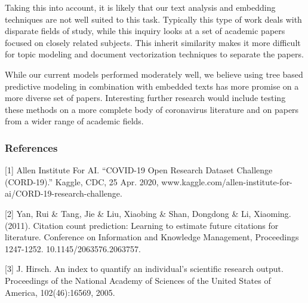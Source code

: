 \documentclass{article} %
\begin{document}
Taking this into account, it is likely that our text analysis and embedding techniques are not well suited to this task. Typically this type of work deals with disparate fields of study, while this inquiry looks at a set of academic papers focused on closely related subjects. This inherit similarity makes it more difficult for topic modeling and document vectorization techniques to separate the papers.

While our current models performed moderately well, we believe using tree based predictive modeling in combination with embedded texts has more promise on a more diverse set of papers. Interesting further research would include testing these methods on a more complete body of coronavirus literature and on papers from a wider range of academic fields. 

\newpage
\subsubsection*{References}

\small{
[1] Allen Institute For AI. “COVID-19 Open Research Dataset Challenge (CORD-19).” Kaggle, CDC, 25 Apr. 2020, www.kaggle.com/allen-institute-for-ai/CORD-19-research-challenge.

[2] Yan, Rui \& Tang, Jie \& Liu, Xiaobing \& Shan, Dongdong \& Li, Xiaoming. (2011). Citation count prediction: Learning to estimate future citations for literature. {\itInternational Conference on  Information and Knowledge Management, Proceedings} 1247-1252. 10.1145/2063576.2063757. 

[3] J. Hirsch. An index to quantify an individual’s scientific
research output. Proceedings of the National Academy of
Sciences of the United States of America, 102(46):16569,
2005.
}
\end{document}
